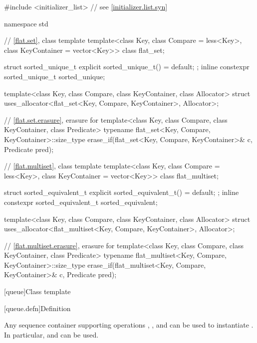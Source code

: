 \begin{codeblock}
#include <initializer_list>     // see \ref{initializer.list.syn}

namespace std {
  // \ref{flat.set}, class template 
  template<class Key, class Compare = less<Key>, class KeyContainer = vector<Key>>
    class flat_set;

  struct sorted_unique_t { explicit sorted_unique_t() = default; };
  inline constexpr sorted_unique_t sorted_unique{};

  template<class Key, class Compare, class KeyContainer, class Allocator>
    struct uses_allocator<flat_set<Key, Compare, KeyContainer>, Allocator>;

  // \ref{flat.set.erasure}, erasure for 
  template<class Key, class Compare, class KeyContainer, class Predicate>
    typename flat_set<Key, Compare, KeyContainer>::size_type
      erase_if(flat_set<Key, Compare, KeyContainer>& c, Predicate pred);

  // \ref{flat.multiset}, class template 
  template<class Key, class Compare = less<Key>, class KeyContainer = vector<Key>>
    class flat_multiset;

  struct sorted_equivalent_t { explicit sorted_equivalent_t() = default; };
  inline constexpr sorted_equivalent_t sorted_equivalent{};

  template<class Key, class Compare, class KeyContainer, class Allocator>
    struct uses_allocator<flat_multiset<Key, Compare, KeyContainer>, Allocator>;

  // \ref{flat.multiset.erasure}, erasure for 
  template<class Key, class Compare, class KeyContainer, class Predicate>
    typename flat_multiset<Key, Compare, KeyContainer>::size_type
      erase_if(flat_multiset<Key, Compare, KeyContainer>& c, Predicate pred);
}
\end{codeblock}

[queue]{Class template }

[queue.defn]{Definition}

\pnum
{}%
Any sequence container supporting operations
,
,
and
can be used to instantiate
.
In particular,
and
can be used.

